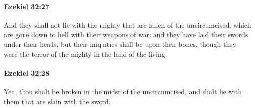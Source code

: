 		\paragraph{Ezekiel 32:27} %
			\label{EZEKIEL-32-27}

			And they shall not lie with the mighty that are fallen of the uncircumcised, which are gone down to hell with their weapons of war: and they have laid their swords under their heads, but their iniquities shall be upon their bones, though they were the terror of the mighty in the land of the living.


		\paragraph{Ezekiel 32:28} %
			\label{EZEKIEL-32-28}

			Yea, thou shalt be broken in the midst of the uncircumcised, and shalt lie with them that are slain with the sword.

